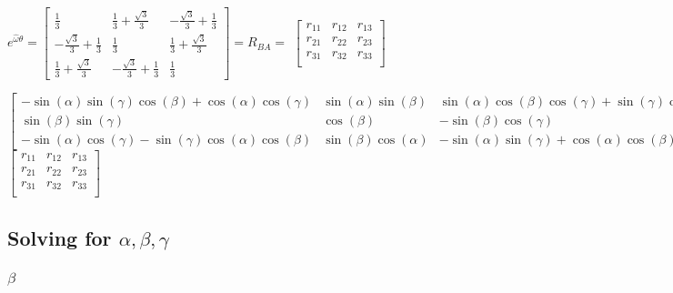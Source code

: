 \documentclass[12pt, letterpaper, oneside, notitlepage, onecolumn]{article}
\begin{document}
$e^{\hat{\omega} \theta} = \left[\begin{matrix}\frac{1}{3} & \frac{1}{3} + \frac{\sqrt{3}}{3} & - \frac{\sqrt{3}}{3} + \frac{1}{3}\\- \frac{\sqrt{3}}{3} + \frac{1}{3} & \frac{1}{3} & \frac{1}{3} + \frac{\sqrt{3}}{3}\\\frac{1}{3} + \frac{\sqrt{3}}{3} & - \frac{\sqrt{3}}{3} + \frac{1}{3} & \frac{1}{3}\end{matrix}\right] = R_{BA} =$
$\begin{bmatrix}
r_{11} & r_{12} & r_{13} \\
r_{21} & r_{22} & r_{23} \\
r_{31} & r_{32} & r_{33} \\
\end{bmatrix}$

$\left[\begin{smallmatrix}- \sin{\left (\alpha \right )} \sin{\left (\gamma \right )} \cos{\left (\beta \right )} + \cos{\left (\alpha \right )} \cos{\left (\gamma \right )} & \sin{\left (\alpha \right )} \sin{\left (\beta \right )} & \sin{\left (\alpha \right )} \cos{\left (\beta \right )} \cos{\left (\gamma \right )} + \sin{\left (\gamma \right )} \cos{\left (\alpha \right )}\\\sin{\left (\beta \right )} \sin{\left (\gamma \right )} & \cos{\left (\beta \right )} & - \sin{\left (\beta \right )} \cos{\left (\gamma \right )}\\- \sin{\left (\alpha \right )} \cos{\left (\gamma \right )} - \sin{\left (\gamma \right )} \cos{\left (\alpha \right )} \cos{\left (\beta \right )} & \sin{\left (\beta \right )} \cos{\left (\alpha \right )} & - \sin{\left (\alpha \right )} \sin{\left (\gamma \right )} + \cos{\left (\alpha \right )} \cos{\left (\beta \right )} \cos{\left (\gamma \right )}\end{smallmatrix}\right] = $
$\begin{bmatrix}
r_{11} & r_{12} & r_{13} \\
r_{21} & r_{22} & r_{23} \\
r_{31} & r_{32} & r_{33} \\
\end{bmatrix}$

\subsection{Solving for $\alpha, \beta, \gamma$}

\subsubsection{$\beta$}
\end{document}
